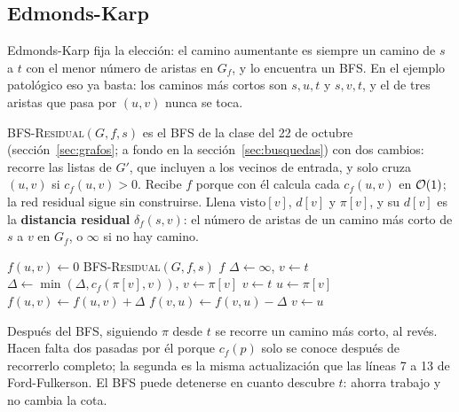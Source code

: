\documentclass[11pt,letterpaper]{article}
\begin{document}

\subsection*{Edmonds-Karp}

Edmonds-Karp fija la elección: el camino aumentante es siempre un
camino de $s$ a $t$ con el menor número de aristas en $G_f$, y lo
encuentra un BFS. En el ejemplo patológico eso ya basta: los caminos
más cortos son $s, u, t$ y $s, v, t$, y el de tres aristas que pasa
por $(u, v)$ nunca se toca.

\textsc{BFS-Residual}$(G, f, s)$ es el BFS de la clase del 22 de
octubre (sección~\ref{sec:grafos}; a fondo en la
sección~\ref{sec:busquedas}) con dos cambios: recorre las listas de
$G'$, que incluyen a los vecinos de entrada, y solo cruza $(u, v)$ si
$c_f(u, v) > 0$. Recibe $f$ porque con él calcula cada $c_f(u, v)$ en
$\mathcal{O}\!\left(1\right)$; la red residual sigue sin construirse. Llena
$\text{visto}[v]$, $d[v]$ y $\pi[v]$, y su $d[v]$ es la
\textbf{distancia residual} $\delta_f(s, v)$: el número de aristas de
un camino más corto de $s$ a $v$ en $G_f$, o $\infty$ si no hay
camino.

\begin{algorithm}[H]
\caption{\textsc{Edmonds-Karp}$(G, s, t)$}
\label{alg:edmonds-karp}
\begin{algorithmic}[1]
    \State $f(u, v) \gets 0$
  \EndFor
  \Loop
    \State \textsc{BFS-Residual}$(G, f, s)$
      \State \Return $f$ 
    \EndIf
    \State $\Delta \gets \infty$, \quad $v \gets t$
     
      \State $\Delta \gets \min(\Delta, c_f(\pi[v], v))$, \quad
             $v \gets \pi[v]$
    \EndWhile
    \State $v \gets t$
     
      \State $u \gets \pi[v]$
        \State $f(u, v) \gets f(u, v) + \Delta$
      \Else
        \State $f(v, u) \gets f(v, u) - \Delta$
      \EndIf
      \State $v \gets u$
    \EndWhile
  \EndLoop
\EndProcedure
\end{algorithmic}
\end{algorithm}

Después del BFS, siguiendo $\pi$ desde $t$ se recorre un camino más
corto, al revés. Hacen falta dos pasadas por él porque $c_f(p)$ solo
se conoce después de recorrerlo completo; la segunda es la misma
actualización que las líneas 7 a 13 de Ford-Fulkerson. El BFS puede
detenerse en cuanto descubre $t$: ahorra trabajo y no cambia la cota.
\end{document}
